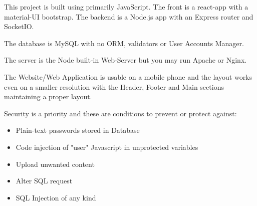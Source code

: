 This project is built using primarily JavaScript. The front is
a react-app with a material-UI bootstrap. The backend is a
Node.js app with an Express router and SocketIO.

The database is MySQL with no ORM, validators or User Accounts
Manager.

The server is the Node built-in Web-Server but you may run Apache or Nginx.

The Website/Web Application is usable on a mobile phone and the layout
works even on a smaller resolution with the Header, Footer and Main sections
maintaining a proper layout.

Security is a priority and these are conditions to prevent or protect against:
\begin{itemize}
    \item Plain-text passwords stored in Database
    \item Code injection of "user" Javascript in unprotected variables
    \item Upload unwanted content
    \item Alter SQL request
    \item SQL Injection of any kind
\end{itemize}